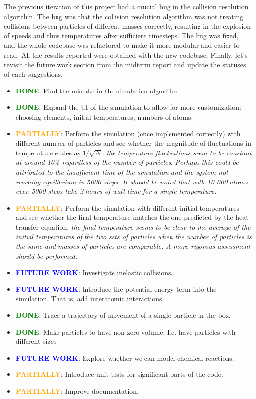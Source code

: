 \documentclass[10pt]{article}
\begin{document}
The previous iteration of this project had a crucial bug in the collision resolution algorithm. The bug was that the collision resolution algorithm was not treating collisions between particles of different masses correctly, resulting in the explosion of speeds and thus temperatures after sufficient timesteps. The bug was fixed, and the whole codebase was refactored to make it more modular and easier to read. All the results reported were obtained with the new codebase. Finally, let's revisit the future work section from the midterm report and update the statuses of each suggestions.
\begin{itemize}
    \itemsep-0.1em
    \item \textbf{\textcolor{green}{DONE}}: Find the mistake in the simulation algorithm
    \item \textbf{\textcolor{green}{DONE}}: Expand the UI of the simulation to allow for more customization: choosing elements, initial temperatures, numbers of atoms. 
    \item \textbf{\textcolor{orange}{PARTIALLY}}: Perform the simulation (once implemented correctly) with different number of particles and see whether the magnitude of fluctuations in temperature scales as $1/\sqrt{N}$. \textit{the temperature fluctuations seem to be constant at around 10\% regardless of the number of particles. Perhaps this could be attributed to the insufficient time of the simulation and the system not reaching equilibrium in 5000 steps. It should be noted that with 10 000 atoms even 5000 steps take 2 hours of wall time for a single temperature.}
    \item \textbf{\textcolor{orange}{PARTIALLY}}: Perform the simulation with different initial temperatures and see whether the final temperature matches the one predicted by the heat transfer equation. \textit{the final temperature seems to be close to the average of the initial temperatures of the two sets of particles when the number of particles is the same and masses of particles are comparable. A more rigorous assessment should be performed.}
    \item \textbf{\textcolor{blue}{FUTURE WORK}}: Investigate inelastic collisions.
    \item \textbf{\textcolor{blue}{FUTURE WORK}}: Introduce the potential energy term into the simulation. That is, add interatomic interactions.
    \item \textbf{\textcolor{green}{DONE}}: Trace a trajectory of movement of a single particle in the box.
    \item \textbf{\textcolor{green}{DONE}}: Make particles to have non-zero volume. I.e. have particles with different sizes.
    \item \textbf{\textcolor{blue}{FUTURE WORK}}: Explore whether we can model chemical reactions.
    \item \textbf{\textcolor{orange}{PARTIALLY}}: Introduce unit tests for significant parts of the code.
    \item \textbf{\textcolor{orange}{PARTIALLY}}: Improve documentation.
\end{itemize}
\end{document}

